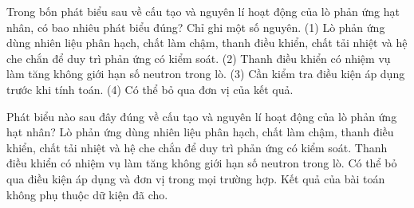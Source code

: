 \begin{ex}
Trong bốn phát biểu sau về cấu tạo và nguyên lí hoạt động của lò phản ứng hạt nhân, có bao nhiêu phát biểu đúng? Chỉ ghi một số nguyên. (1) Lò phản ứng dùng nhiên liệu phân hạch, chất làm chậm, thanh điều khiển, chất tải nhiệt và hệ che chắn để duy trì phản ứng có kiểm soát. (2) Thanh điều khiển có nhiệm vụ làm tăng không giới hạn số neutron trong lò. (3) Cần kiểm tra điều kiện áp dụng trước khi tính toán. (4) Có thể bỏ qua đơn vị của kết quả.
\end{ex}

\begin{ex}
Phát biểu nào sau đây đúng về cấu tạo và nguyên lí hoạt động của lò phản ứng hạt nhân?
\choice
{\True Lò phản ứng dùng nhiên liệu phân hạch, chất làm chậm, thanh điều khiển, chất tải nhiệt và hệ che chắn để duy trì phản ứng có kiểm soát.}
{Thanh điều khiển có nhiệm vụ làm tăng không giới hạn số neutron trong lò.}
{Có thể bỏ qua điều kiện áp dụng và đơn vị trong mọi trường hợp.}
{Kết quả của bài toán không phụ thuộc dữ kiện đã cho.}
\end{ex}

